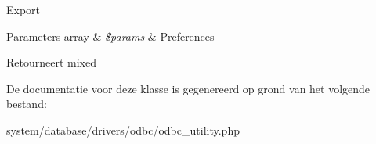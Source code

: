 Export


\begin{DoxyParams}[1]{Parameters}
array & {\em \$params} & Preferences \\
\hline
\end{DoxyParams}
\begin{DoxyReturn}{Retourneert}
mixed 
\end{DoxyReturn}


De documentatie voor deze klasse is gegenereerd op grond van het volgende bestand\+:\begin{DoxyCompactItemize}
\item 
system/database/drivers/odbc/odbc\+\_\+utility.\+php\end{DoxyCompactItemize}
